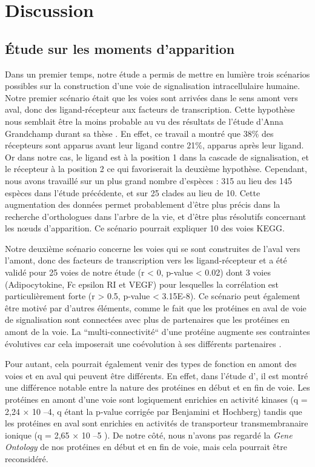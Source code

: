 \chapter[Discussion]{Discussion}
\thispagestyle{firstpage}
\onehalfspacing

\section{Étude sur les moments d’apparition}
\par Dans un premier temps, notre étude a permis de mettre en lumière trois scénarios possibles sur la construction d’une voie de signalisation intracellulaire humaine. Notre premier scénario était que les voies sont arrivées dans le sens amont vers aval, donc des ligand-récepteur aux facteurs de transcription. Cette hypothèse nous semblait être la moins probable au vu des résultats de l’étude d’Anna Grandchamp durant sa thèse \parencite{grandchamp_synchronous_2018}. En effet, ce travail a montré que 38\% des récepteurs sont apparus avant leur ligand contre 21\%, apparus après leur ligand. Or dans notre cas, le ligand est à la position 1 dans la cascade de signalisation, et le récepteur à la position 2 ce qui favoriserait la deuxième hypothèse. Cependant, nous avons travaillé sur un plus grand nombre d’espèces : 315 au lieu des 145 espèces dans l’étude précédente, et sur 25 clades au lieu de 10. Cette augmentation des données permet probablement d’être plus précis dans la recherche d’orthologues dans l’arbre de la vie, et d’être plus résolutifs concernant les nœuds d’apparition. Ce scénario pourrait expliquer 10 des voies KEGG. 
\par Notre deuxième scénario concerne les voies qui se sont construites de l’aval vers l’amont, donc des facteurs de transcription vers les ligand-récepteur et a été validé pour 25 voies de notre étude (r < 0, p-value < 0.02) dont 3 voies (Adipocytokine, Fc epsilon RI et VEGF) pour lesquelles la corrélation est particulièrement forte (r > 0.5, p-value < 3.15E-8). Ce scénario peut également être motivé par d’autres éléments, comme le fait que les protéines en aval de voie de signalisation sont connectées avec plus de partenaires que les protéines en amont de la voie. La “multi-connectivité“ d’une protéine augmente ses contraintes évolutives car cela imposerait une coévolution à ses différents partenaires \parencite{fraser_evolutionary_2002, hahn_molecular_2004, krylov_gene_2003}. 
\par Pour autant, cela pourrait également venir des types de fonction en amont des voies et en aval qui peuvent être différents. En effet, dans l’étude d’\cite{alvarez-ponce_relationship_2012}, il est montré une différence notable entre la nature des protéines en début et en fin de voie. Les protéines en amont d’une voie sont logiquement enrichies en activité kinases (q = 2,24 × 10 –4, q étant la p-value corrigée par Benjamini et Hochberg) tandis que les protéines en aval sont enrichies en activités de transporteur transmembranaire ionique (q = 2,65 × 10 –5 ). De notre côté, nous n’avons pas regardé la \textit{Gene Ontology} de nos protéines en début et en fin de voie, mais cela pourrait être reconsidéré.
